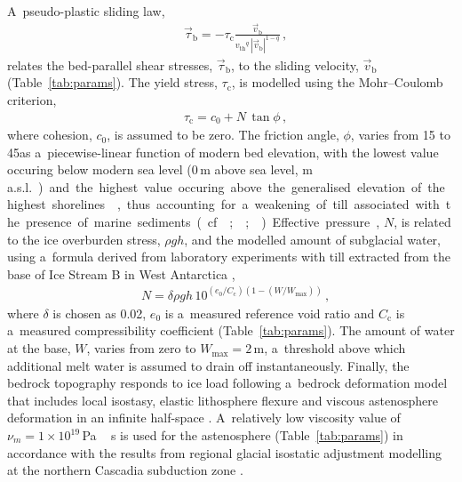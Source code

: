 \documentclass[tc, manuscript]{copernicus}
\begin{document}
      A~pseudo-plastic sliding law,
\begin{align}
&\label{eqn:pseudoplastic}
    \vec{\tau}_{\mathrm{b}} = -\tau_{\mathrm{c}} \frac{\vec{v}_{\mathrm{b}}}{{v_{\text{th}}}^q\,|\vec{v}_{\mathrm{b}}|^{1-q}} \,,
\end{align}
      relates the bed-parallel shear stresses, $\vec{\tau}_{\mathrm{b}}$, to the
      sliding velocity, $\vec{v}_{\mathrm{b}}$ (Table~\ref{tab:params}). The yield
      stress, $\tau_{\mathrm{c}}$, is modelled using the Mohr--Coulomb criterion,
\begin{align}
&\tau_{\mathrm{c}} = c_0 + N\,\tan{\phi} \,,
\end{align}
      where cohesion, $c_0$, is assumed to be zero. The friction angle,
      $\phi$, varies from 15 to 45\degree as a~piecewise-linear function of
      modern bed elevation, with the lowest value occuring below modern sea
      level (0\,\unit{m} above sea level, \unit{m\,a.s.l.}) and the highest
      value occuring above the generalised elevation of the highest
      shorelines \citep[200\,\unit{m\,a.s.l.},][Fig.~5]{Clague.1981}, thus
      accounting for a~weakening of till associated with the presence of
      marine sediments (cf. \citealp{Martin.etal.2011};
      \citealp[supplement]{Aschwanden.etal.2013};
      \citealp{PISM-authors.2015}). Effective pressure, $N$, is related to
      the ice overburden stress, $\rho gh$, and the modelled amount of
      subglacial water, using a~formula derived from laboratory experiments
      with till extracted from the base of Ice Stream B in West Antarctica
      \citep{Tulaczyk.etal.2000, Bueler.Pelt.2015},
\begin{align}
&N = \delta \rho gh \, 10^{(e_0/C_{\mathrm{c}}) (1 - (W/W_{\text{max}}))} \,,
\end{align}
      where $\delta$ is chosen as 0.02, $e_0$ is a~measured reference void
      ratio and $C_{\mathrm{c}}$ is a~measured compressibility coefficient
      (Table~\ref{tab:params}). The amount of water at the base, $W$, varies
      from zero to $W_{\text{max}}=2$\,\unit{m}, a~threshold above which additional
      melt water is assumed to drain off instantaneously. Finally, the
      bedrock topography responds to ice load following a~bedrock
      deformation model that includes local isostasy, elastic lithosphere
      flexure and viscous astenosphere deformation in an infinite half-space
      \citep{Lingle.Clark.1985,Bueler.etal.2007}. A~relatively low viscosity
      value of $\nu_{m} = 1\times10^{19}$\,\unit{Pa\,s} is used for the
      astenosphere (Table~\ref{tab:params}) in accordance with the results
      from regional glacial isostatic adjustment modelling at the northern
      Cascadia subduction zone \citep{James.etal.2009}.
\end{document}
